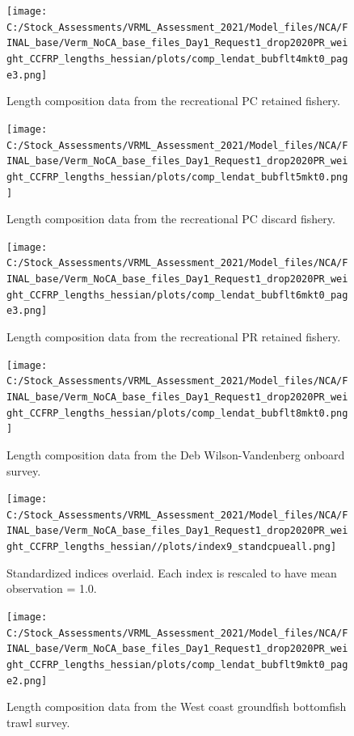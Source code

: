 \documentclass[11pt,
  english,
]{article}
\begin{document}
\begin{figure}
\centering
\texttt{[image: C:/Stock\_Assessments/VRML\_Assessment\_2021/Model\_files/NCA/FINAL\_base/Verm\_NoCA\_base\_files\_Day1\_Request1\_drop2020PR\_weight\_CCFRP\_lengths\_hessian/plots/comp\_lendat\_bubflt4mkt0\_page3.png]}
\caption{Length composition data from the recreational PC retained fishery.\label{fig:len-data-REC-PC}}
\end{figure}

\begin{figure}
\centering
\texttt{[image: C:/Stock\_Assessments/VRML\_Assessment\_2021/Model\_files/NCA/FINAL\_base/Verm\_NoCA\_base\_files\_Day1\_Request1\_drop2020PR\_weight\_CCFRP\_lengths\_hessian/plots/comp\_lendat\_bubflt5mkt0.png]}
\caption{Length composition data from the recreational PC discard fishery.\label{fig:len-data-REC-PC-DIS}}
\end{figure}

\begin{figure}
\centering
\texttt{[image: C:/Stock\_Assessments/VRML\_Assessment\_2021/Model\_files/NCA/FINAL\_base/Verm\_NoCA\_base\_files\_Day1\_Request1\_drop2020PR\_weight\_CCFRP\_lengths\_hessian/plots/comp\_lendat\_bubflt6mkt0\_page3.png]}
\caption{Length composition data from the recreational PR retained fishery.\label{fig:len-data-REC-PR}}
\end{figure}

\begin{figure}
\centering
\texttt{[image: C:/Stock\_Assessments/VRML\_Assessment\_2021/Model\_files/NCA/FINAL\_base/Verm\_NoCA\_base\_files\_Day1\_Request1\_drop2020PR\_weight\_CCFRP\_lengths\_hessian/plots/comp\_lendat\_bubflt8mkt0.png]}
\caption{Length composition data from the Deb Wilson-Vandenberg onboard survey.\label{fig:len-data-DWV-ONBOARD}}
\end{figure}

\begin{figure}
\centering
\texttt{[image: C:/Stock\_Assessments/VRML\_Assessment\_2021/Model\_files/NCA/FINAL\_base/Verm\_NoCA\_base\_files\_Day1\_Request1\_drop2020PR\_weight\_CCFRP\_lengths\_hessian//plots/index9\_standcpueall.png]}
\caption{Standardized indices overlaid. Each index is rescaled to have mean observation = 1.0.\label{fig:cpueall}}
\end{figure}

\begin{figure}
\centering
\texttt{[image: C:/Stock\_Assessments/VRML\_Assessment\_2021/Model\_files/NCA/FINAL\_base/Verm\_NoCA\_base\_files\_Day1\_Request1\_drop2020PR\_weight\_CCFRP\_lengths\_hessian/plots/comp\_lendat\_bubflt9mkt0\_page2.png]}
\caption{Length composition data from the West coast groundfish bottomfish trawl survey.\label{fig:len-data-NWFSC-TWL}}
\end{figure}
\end{document}
